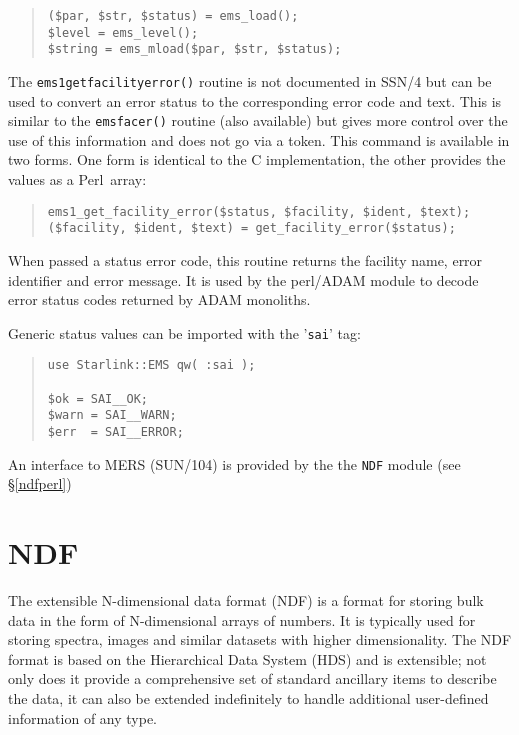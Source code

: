 \documentclass[twoside,11pt]{article}
\newenvironment{myquote}{\begin{quote}\begin{small}}{\end{small}\end{quote}}
\newcommand{\perl}{\xref{\textsf{Perl}}{sun193}{}}
\newcommand{\xref}[3]{#1}
\renewcommand{\_}{\texttt{\symbol{95}}}
\begin{document}
\begin{myquote}
\begin{verbatim}
($par, $str, $status) = ems_load();
$level = ems_level();
$string = ems_mload($par, $str, $status);
\end{verbatim}
\end{myquote}

The \texttt{ems1\_get\_facility\_error()} routine is not documented in
\xref{SSN/4}{ssn4}{} but can be used to convert an error status to the
corresponding error code and text. This is similar to the
\texttt{ems\_facer()} routine (also available) but gives more control over the
use of this information and does not go via a token.  This command is
available in two forms. One form is identical to the C implementation, the
other provides the values as a \perl\ array:

\begin{myquote}
\begin{verbatim}
ems1_get_facility_error($status, $facility, $ident, $text);
($facility, $ident, $text) = get_facility_error($status);
\end{verbatim}
\end{myquote}

When passed a status error code, this routine returns the facility
name, error identifier and error message. It is used by the perl/ADAM
module to decode error status codes returned by ADAM monoliths. 

Generic status values can be imported with the '\texttt{sai}' tag:

\begin{myquote}
\begin{verbatim}
use Starlink::EMS qw( :sai );

$ok = SAI__OK;
$warn = SAI__WARN;
$err  = SAI__ERROR;
\end{verbatim}
\end{myquote}

An interface to MERS (\xref{SUN/104}{sun104}{}) is provided by the 
the \texttt{NDF} module (see \S\ref{ndfperl})

\section{NDF\label{ndfperl}}

The extensible N-dimensional data format (NDF) is a format for storing bulk
data in the form of N-dimensional arrays of numbers.  It is typically used
for storing spectra, images and similar datasets with higher dimensionality.
The NDF format is based on the Hierarchical Data System (HDS) and is
extensible; not only does it provide a comprehensive set of standard
ancillary items to describe the data, it can also be extended indefinitely
to handle additional user-defined information of any type.
\end{document}
